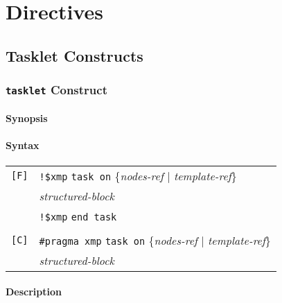 \chapter{Directives}

\section{Tasklet Constructs}

\subsection{{\tt tasklet} Construct}

\subsubsection*{Synopsis}


\subsubsection*{Syntax}

\begin{tabular}{ll}
\verb![F]! & \verb|!$xmp| {\tt task on} \{{\it nodes-ref} $\vert$ {\it
 template-ref}\} \\
& {\it structured-block} \\
& \verb|!$xmp| {\tt end task} \\
& \\
\verb![C]! & \verb|#pragma xmp| {\tt task on} \{{\it nodes-ref} $\vert$
     {\it template-ref}\} \\
& {\it structured-block} \\
\end{tabular}

\subsubsection*{Description}




